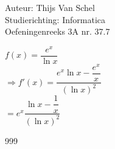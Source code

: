 \documentclass[a4paper]{article}
\begin{document}
  
\noindent \large Auteur: Thijs Van Schel \\
\noindent \large Studierichting: Informatica\\
\noindent \large Oefeningenreeks 3A nr. 37.7\\

\medskip

\normalsize

$f(x) = \dfrac{e^x}{\ln x}$\\

$ \Rightarrow f'(x) = \dfrac{e^x\ln x-\dfrac{e^x}{x}}{(\ln x)^2}$\\

$= e^x \dfrac{\ln x-\dfrac{1}{x}}{(\ln x)^2}$\\

\begin{thebibliography}{999}
\end{thebibliography}
\end{document}
